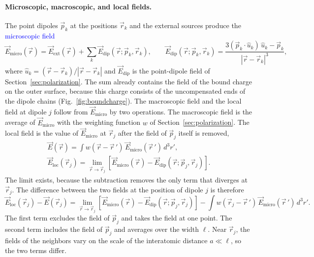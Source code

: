 \paragraph{Microscopic, macroscopic, and local fields.}
The point dipoles $\vec p_k$ at the positions $\vec r_k$ and the external sources produce the \textcolor{blue}{microscopic field}
\begin{equation*}
    \vec E_{\text{micro}}(\vec r) = \vec E_{\text{ext}}(\vec r) + \sum_k \vec E_{\text{dip}}(\vec r;\vec p_k,\vec r_k),
    \qquad
    \vec E_{\text{dip}}(\vec r;\vec p_k,\vec r_k) = \frac{3(\vec p_k\cdot\hat u_k)\,\hat u_k - \vec p_k}{|\vec r - \vec r_k|^3},
\end{equation*}
where $\hat u_k = (\vec r - \vec r_k)/|\vec r - \vec r_k|$ and $\vec E_{\text{dip}}$ is the point-dipole field of Section~\ref{sec:polarization}. The sum already contains the field of the bound charge on the outer surface, because this charge consists of the uncompensated ends of the dipole chains (Fig.~\ref{fig:boundcharge}). The macroscopic field and the local field at dipole $j$ follow from $\vec E_{\text{micro}}$ by two operations. The macroscopic field is the average of $\vec E_{\text{micro}}$ with the weighting function $w$ of Section~\ref{sec:polarization}. The local field is the value of $\vec E_{\text{micro}}$ at $\vec r_j$ after the field of $\vec p_j$ itself is removed,
\begin{equation}
    \boxed{
    \begin{gathered}
    \vec E(\vec r) = \int w(\vec r - \vec r\,')\,\vec E_{\text{micro}}(\vec r\,')\,d^3r',\\[4pt]
    \vec E_{\text{loc}}(\vec r_j) = \lim_{\vec r \to \vec r_j}\left[\vec E_{\text{micro}}(\vec r) - \vec E_{\text{dip}}(\vec r;\vec p_j,\vec r_j)\right].
    \end{gathered}
    }
\end{equation}
The limit exists, because the subtraction removes the only term that diverges at $\vec r_j$. The difference between the two fields at the position of dipole $j$ is therefore
\begin{equation*}
    \vec E_{\text{loc}}(\vec r_j) - \vec E(\vec r_j)
    = \lim_{\vec r \to \vec r_j}\left[\vec E_{\text{micro}}(\vec r) - \vec E_{\text{dip}}(\vec r;\vec p_j,\vec r_j)\right]
    - \int w(\vec r_j - \vec r\,')\,\vec E_{\text{micro}}(\vec r\,')\,d^3r'.
\end{equation*}
The first term excludes the field of $\vec p_j$ and takes the field at one point. The second term includes the field of $\vec p_j$ and averages over the width $\ell$. Near $\vec r_j$, the fields of the neighbors vary on the scale of the interatomic distance $a \ll \ell$, so the two terms differ.

